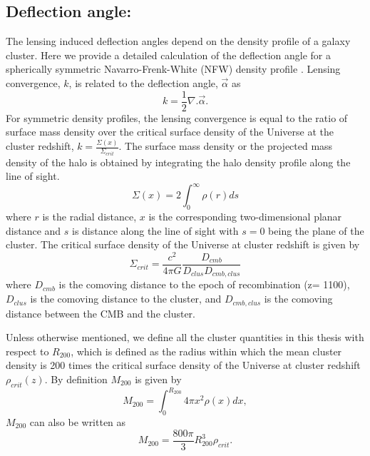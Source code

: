 \subsection*{Deflection angle:}
\label{sec_def_field}
The lensing induced deflection angles depend on the density profile of a galaxy cluster. Here we provide a detailed calculation of the deflection angle for a spherically symmetric Navarro-Frenk-White (NFW) density profile \citep{navarro96}.  Lensing convergence, $k$, is related to the deflection angle, $\vec{\alpha}$ as %
\begin{equation}
 k = \frac{1}{2}\nabla. \vec{\alpha}. %
\label{eq_kappa}
 \end{equation}
 For symmetric density profiles, the lensing convergence is equal to the ratio of surface mass density over the critical surface density of the Universe at the cluster redshift, $k = \frac{\Sigma(x)}{\Sigma_{crit}}$.
The surface mass density or the projected mass density of the halo is obtained by integrating the halo density profile along the line of sight. 
 \begin{equation}
 \Sigma(x) = 2 \int^{\infty}_{0} \rho(r) ds
 \label{eq:surface_density}
 \end{equation}
 where $r$ is the radial distance, $x$ is the corresponding two-dimensional planar distance and $s$ is distance along the line of sight with $s = 0$ being the plane of the cluster.
 The critical surface density of the Universe at cluster redshift is given by
 \begin{equation}
 \Sigma_{crit} = \frac{c^{2}}{4\pi G} \frac{D_{cmb}}{D_{clus}D_{cmb,clus}}
 \end{equation}
 where $D_{cmb}$ is the comoving distance to the epoch of recombination (z= 1100), $D_{clus}$ is the comoving distance to the cluster, and $D_{cmb,clus}$ is the comoving distance between the CMB and the cluster.
 
 Unless otherwise mentioned, we define all the cluster quantities in this thesis with respect to $R_{200}$, which is defined as the radius within which the mean cluster density is 200 times the critical surface density of the Universe at cluster redshift $\rho_{crit}(z)$. By definition $M_{200}$ is given by 
 \begin{equation}
 M_{200} = \int^{R_{200}}_{0}  4\pi x^{2} \rho(x) dx,
 \end{equation}
 $M_{200}$ can also be written as
 \begin{equation}
 M_{200} = \frac{800\pi}{3} R^{3}_{200} \rho_{crit}.
 \end{equation}
 
